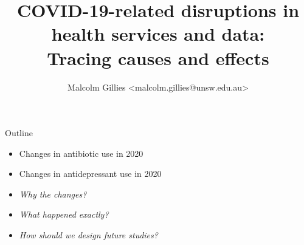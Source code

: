 \documentclass[aspectratio=169,12pt]{beamer} %
\title{COVID-19-related disruptions in\\health services and data:\\Tracing causes and effects}
\author{Malcolm Gillies <malcolm.gillies@unsw.edu.au>}
\institute{27 April 2023}
\begin{document}

{
  \begin{frame}[plain]
    \titlepage
  \end{frame}
}

{
\begin{frame}{}
\end{frame}
}

\begin{frame}{Outline}
	\begin{itemize}
		\item Changes in antibiotic use in 2020
		\item Changes in antidepressant use in 2020
		\item \emph{Why the changes?}
		\item \emph{What happened exactly?}
		\item \emph{How should we design future studies?}
	\end{itemize}
\end{frame}
\end{document}
